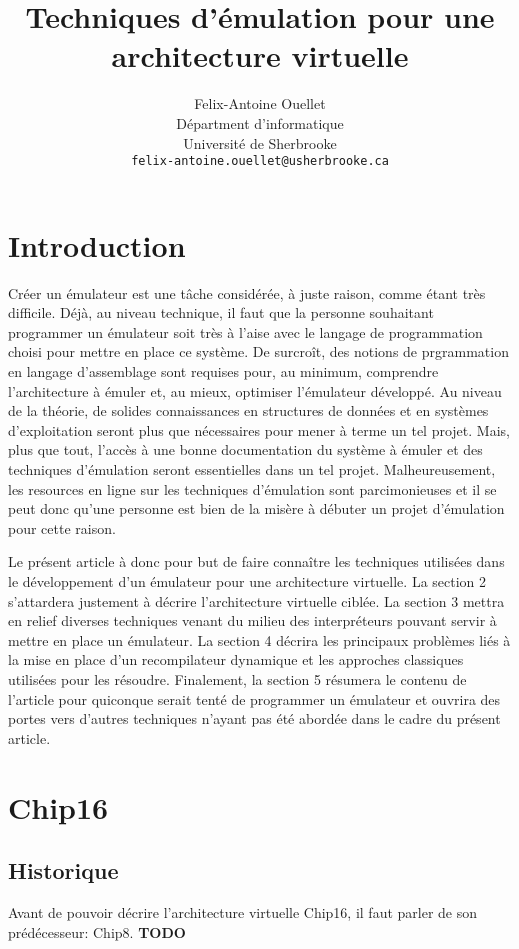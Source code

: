 \documentclass{article} %
\title{Techniques d'émulation pour une architecture virtuelle}
\author{
Felix-Antoine Ouellet \\
Départment d'informatique \\
Université de Sherbrooke \\
\texttt{felix-antoine.ouellet@usherbrooke.ca} \\
}
\begin{document}
\maketitle

\begin{abstract}
\end{abstract}

\section{Introduction}
Créer un émulateur est une tâche considérée, à juste raison, comme étant très difficile. Déjà, au niveau technique, il faut que la personne souhaitant programmer un émulateur soit très à l'aise avec le langage de programmation choisi pour mettre en place ce système. De surcroît, des notions de prgrammation en langage d'assemblage sont requises pour, au minimum, comprendre l'architecture à émuler et, au mieux, optimiser l'émulateur développé. Au niveau de la théorie, de solides connaissances en structures de données et en systèmes d'exploitation seront plus que nécessaires pour mener à terme un tel projet. Mais, plus que tout, l'accès à une bonne documentation du système à émuler et des techniques d'émulation seront essentielles dans un tel projet. Malheureusement, les resources en ligne sur les techniques d'émulation sont parcimonieuses et il se peut donc qu'une personne est bien de la misère à débuter un projet d'émulation pour cette raison.

Le présent article à donc pour but de faire connaître les techniques utilisées dans le développement d'un émulateur pour une architecture virtuelle. La section 2 s'attardera justement à décrire l'architecture virtuelle ciblée. La section 3 mettra en relief diverses techniques venant du milieu des interpréteurs pouvant servir à mettre en place un émulateur. La section 4 décrira les principaux problèmes liés à la mise en place d'un recompilateur dynamique et les approches classiques utilisées pour les résoudre. Finalement, la section 5 résumera le contenu de l'article pour quiconque serait tenté de programmer un émulateur et ouvrira des portes vers d'autres techniques n'ayant pas été abordée dans le cadre du présent article.

\section{Chip16}

\subsection{Historique}
Avant de pouvoir décrire l'architecture virtuelle Chip16, il faut parler de son prédécesseur: Chip8. \textbf{TODO}
\end{document}
